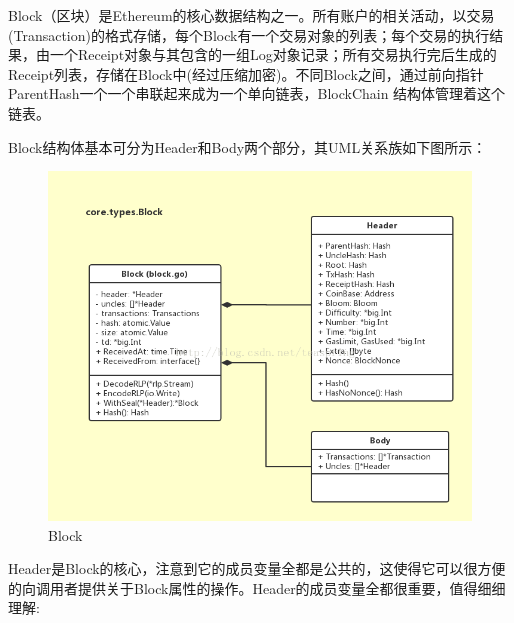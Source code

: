 \documentclass[UTF8]{ctexart}
\begin{document}
Block（区块）是Ethereum的核心数据结构之一。所有账户的相关活动，以交易(Transaction)的格式存储，每个Block有一个交易对象的列表；每个交易的执行结果，由一个Receipt对象与其包含的一组Log对象记录；所有交易执行完后生成的Receipt列表，存储在Block中(经过压缩加密)。不同Block之间，通过前向指针ParentHash一个一个串联起来成为一个单向链表，BlockChain 结构体管理着这个链表。

Block结构体基本可分为Header和Body两个部分，其UML关系族如下图所示：


\begin{figure}
	\centering
	\includegraphics[scale=0.5]{block.png}
	\caption{Block}
	\label{block}
\end{figure}


Header是Block的核心，注意到它的成员变量全都是公共的，这使得它可以很方便的向调用者提供关于Block属性的操作。Header的成员变量全都很重要，值得细细理解:
\end{document}
